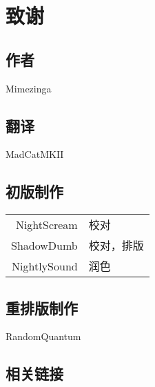 \chapter{致谢}

\section*{作者}

\begin{center}
    Mimezinga
\end{center}

\section*{翻译}

\begin{center}
    MadCatMKII
\end{center}

\section*{初版制作}

\begin{table}[ht!]
    \centering
    \begin{tabular}{rl}
        NightScream & 校对 \\
        ShadowDumb & 校对，排版 \\
        NightlySound & 润色 \\
    \end{tabular}
\end{table}

\section*{重排版制作}

\begin{center}
    RandomQuantum
\end{center}

\section*{相关链接}

